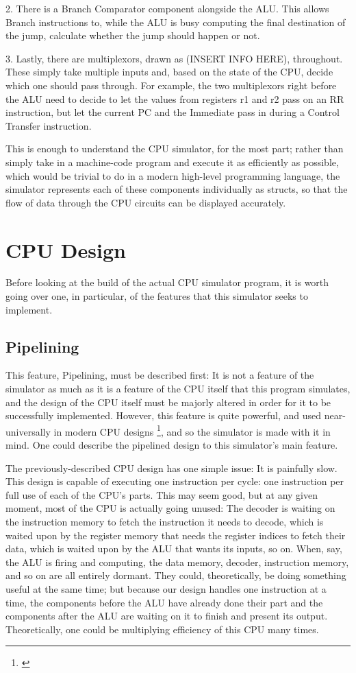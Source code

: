 \documentclass[12pt,twoside]{reedthesis}
\begin{document}
2. There is a Branch Comparator component alongside the ALU. This allows Branch instructions to, while the ALU is busy computing the final destination of the jump, calculate whether the jump should happen or not.

3. Lastly, there are multiplexors, drawn as (INSERT INFO HERE), throughout. These simply take multiple inputs and, based on the state of the CPU, decide which one should pass through. For example, the two multiplexors right before the ALU need to decide to let the values from registers r1 and r2 pass on an RR instruction, but let the current PC and the Immediate pass in during a Control Transfer instruction.

This is enough to understand the CPU simulator, for the most part; rather than simply take in a machine-code program and execute it as efficiently as possible, which would be trivial to do in a modern high-level programming language, the simulator represents each of these components individually as structs, so that the flow of data through the CPU circuits can be displayed accurately.

\chapter{CPU Design}

Before looking at the build of the actual CPU simulator program, it is worth going over one, in particular, of the features that this simulator seeks to implement.

\section{Pipelining}

This feature, Pipelining, must be described first: It is not a feature of the simulator as much as it is a feature of the CPU itself that this program simulates, and the design of the CPU itself must be majorly altered in order for it to be successfully implemented. However, this feature is quite powerful, and used near-universally in modern CPU designs \footnote{\cite{denning}}, and so the simulator is made with it in mind. One could describe the pipelined design to this simulator's main feature.

The previously-described CPU design has one simple issue: It is painfully slow. This design is capable of executing one instruction per cycle: one instruction per full use of each of the CPU's parts. This may seem good, but at any given moment, most of the CPU is actually going unused: The decoder is waiting on the instruction memory to fetch the instruction it needs to decode, which is waited upon by the register memory that needs the register indices to fetch their data, which is waited upon by the ALU that wants its inputs, so on.
When, say, the ALU is firing and computing, the data memory, decoder, instruction memory, and so on are all entirely dormant. They could, theoretically, be doing something useful at the same time; but because our design handles one instruction at a time, the components before the ALU have already done their part and the components after the ALU are waiting on it to finish and present its output. Theoretically, one could be multiplying efficiency of this CPU many times.
\end{document}
